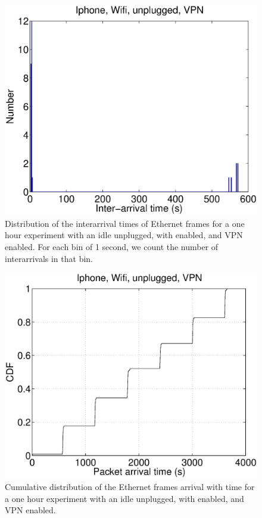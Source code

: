 \begin{figure}
\centering
        \includegraphics[width=0.8\linewidth]{../../code/pushNotification/Fig/bw_iphone_wifi_unplug_vpn_interTs.eps}
  \caption{Distribution of the interarrival times of Ethernet frames
    for a one hour experiment with an idle \iphone{} unplugged, with \wifi{}
    enabled, and VPN enabled. For each bin of 1 second, we count
    the number of interarrivals in that bin.}
  \label{fig:push_wv_interTs}
\end{figure}

\begin{figure}
\centering
        \includegraphics[width=0.8\linewidth]{../../code/pushNotification/Fig/bw_iphone_wifi_unplug_vpn_ts.eps}
  \caption{Cumulative distribution of the Ethernet frames
          arrival with time for a one hour experiment with an idle
          \iphone{} unplugged, with \wifi{} enabled, and VPN
          enabled.}
  \label{fig:push_wv_ts}
\end{figure}

